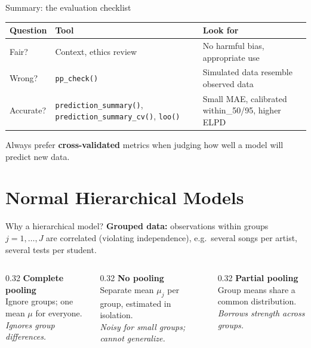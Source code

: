 \documentclass[aspectratio=43,11pt]{beamer}
\begin{document}
\begin{frame}{Summary: the evaluation checklist}
  \begin{center}
  \small
  \begin{tabular}{p{2.2cm}p{4.2cm}p{3.3cm}}
    \toprule
    \textbf{Question} & \textbf{Tool} & \textbf{Look for}\\
    \midrule
    Fair? & Context, ethics review & No harmful bias, appropriate use\\[0.4em]
    Wrong? & \texttt{pp\_check()} & Simulated data resemble observed data\\[0.4em]
    Accurate? & \texttt{prediction\_summary()}, \texttt{prediction\_summary\_cv()}, \texttt{loo()} & Small MAE, calibrated within\_50/95, higher ELPD\\
    \bottomrule
  \end{tabular}
  \end{center}
  Always prefer \textbf{cross-validated} metrics when judging how well a model will predict new data.
\end{frame}

\section{Normal Hierarchical Models}

\begin{frame}{Why a hierarchical model?}
  \textbf{Grouped data:} observations within groups $j=1,\dots,J$ are correlated (violating independence), e.g.\ several songs per artist, several tests per student.
  \vspace{.5cm}
  \begin{columns}[T]
    \begin{column}{0.32\textwidth}
      \textbf{Complete pooling}\\
      Ignore groups; one mean $\mu$ for everyone.\\
      \emph{Ignores group differences.}
    \end{column}
    \begin{column}{0.32\textwidth}
      \textbf{No pooling}\\
      Separate mean $\mu_j$ per group, estimated in isolation.\\
      \emph{Noisy for small groups; cannot generalize.}
    \end{column}
    \begin{column}{0.32\textwidth}
      \textbf{Partial pooling}\\
      Group means share a common distribution.\\
      \emph{Borrows strength across groups.}
    \end{column}
  \end{columns}
\end{frame}
\end{document}
